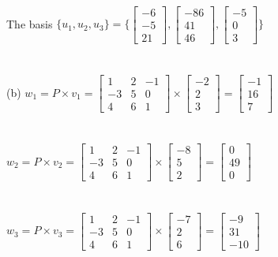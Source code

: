 \documentclass{article}
\begin{document}
\\\\\\
\indent\indent\indent The basis $\{u_1, u_2, u_3\} = \{\begin{bmatrix}-6\\-5\\21\end{bmatrix}, \begin{bmatrix}-86\\41\\46\end{bmatrix}, \begin{bmatrix}-5\\0\\3\end{bmatrix}\}$
\\\\\\
\indent(b)\indent
\space $w_1 = P \times v_1 = \begin{bmatrix}1&2&-1\\-3&5&0\\4&6&1\end{bmatrix} \times \begin{bmatrix}-2\\2\\3\end{bmatrix} = \begin{bmatrix}-1\\16\\7\end{bmatrix} $
\\\\\\
\indent\indent\indent $ w_2 = P \times v_2 = \begin{bmatrix}1&2&-1\\-3&5&0\\4&6&1\end{bmatrix} \times \begin{bmatrix}-8\\5\\2\end{bmatrix} = \begin{bmatrix}0\\49\\0\end{bmatrix} $
\\\\\\
\indent\indent\indent $ w_3 = P \times v_3 = \begin{bmatrix}1&2&-1\\-3&5&0\\4&6&1\end{bmatrix} \times \begin{bmatrix}-7\\2\\6\end{bmatrix} = \begin{bmatrix}-9\\31\\-10\end{bmatrix} $
\end{document}
